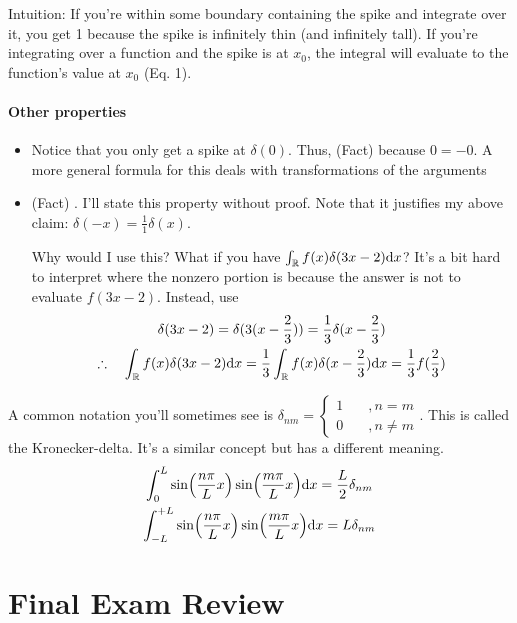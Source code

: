 Intuition: If you're within some boundary containing the spike and integrate over it, you get 1 because the spike is infinitely thin (and infinitely tall). If you're integrating over a function and the spike is at $x_0$, the integral will evaluate to the function's value at $x_0$ (Eq. 1).

\paragraph*{Other properties}
\begin{itemize}
  \item  Notice that you only get a spike at $\delta(0)$.  Thus, (Fact)  because $0 = -0$. A more general formula for this deals with transformations of the arguments
  \item (Fact) . I'll state this property without proof. Note that it justifies my above claim: $\delta(-x) = \frac{1}{1} \delta (x) $.  
  
  Why would I use this? What if you have $\int_\mathbb{R} f(x)  \delta(3x - 2) \text{d} x  $? It's a bit hard to interpret where the nonzero portion is because the answer is not to evaluate $f(3x-2)$. Instead, use 
  \begin{gather*}
    \delta(3x - 2) = \delta (3 (x - \frac{2}{3})) = \frac{1}{3} \delta(x - \frac{2}{3}) \\ 
    \therefore \quad 
    \int_\mathbb{R} f(x)  \delta(3x - 2) \text{d} x  
    = \frac{1}{3}\int_\mathbb{R} f(x)  \delta(x - \frac{2}{3}) \text{d} x = \frac{1}{3} f(\frac{2}{3})  
  \end{gather*}
\end{itemize} 

A common notation you'll sometimes see is $\delta_{nm} = \begin{cases}
  1 \quad &, n = m \\ 0 \quad &,  n \neq m 
\end{cases}$. This is called the Kronecker-delta. It's a similar concept but has a different meaning. 
\begin{gather*}
  \int_0^L \sin(\frac{n\pi}{L} x) \sin(\frac{m\pi}{L} x) \text{d} x = \frac{L}{2} \delta_{nm} \\
  \int_{-L}^{+L} \sin(\frac{n\pi}{L} x) \sin(\frac{m\pi}{L} x) \text{d} x = L \delta_{nm}
\end{gather*}


\section{Final Exam Review}

